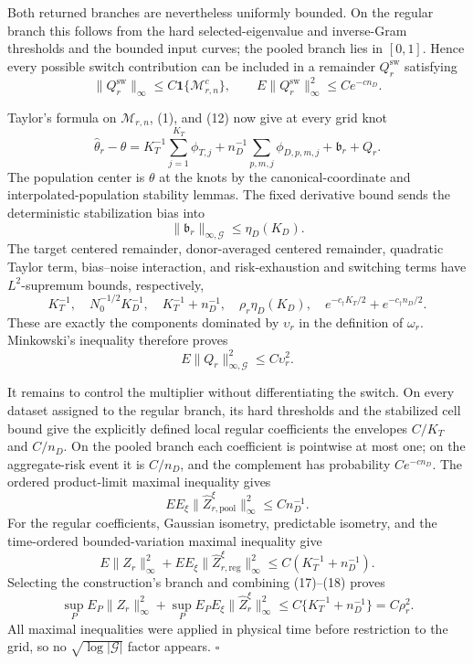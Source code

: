 Both returned branches are nevertheless uniformly bounded.  On the regular branch this follows from the hard selected-eigenvalue and inverse-Gram thresholds and the bounded input curves; the pooled branch lies in \([0,1]\).  Hence every possible switch contribution can be included in a remainder \(Q_r^{\mathrm{sw}}\) satisfying
\[
 \|Q_r^{\mathrm{sw}}\|_\infty
 \le C\mathbf1\{\mathcal M_{r,n}^c\},
 \qquad E\|Q_r^{\mathrm{sw}}\|_\infty^2\le Ce^{-cn_D}. \tag{12}
\]

Taylor's formula on \(\mathcal M_{r,n}\), (1), and (12) now give at every grid knot
\[
 \widehat\theta_r-\theta
 =K_T^{-1}\sum_{j=1}^{K_T}\phi_{T,j}
 +n_D^{-1}\sum_{p,m,j}\phi_{D,p,m,j}
 +\mathfrak b_r+Q_r.                                    \tag{13}
\]
The population center is \(\theta\) at the knots by the canonical-coordinate and interpolated-population stability lemmas.  The fixed derivative bound sends the deterministic stabilization bias into
\[
 \|\mathfrak b_r\|_{\infty,\mathcal G}\le\eta_D(K_D). \tag{14}
\]
The target centered remainder, donor-averaged centered remainder, quadratic Taylor term, bias--noise interaction, and risk-exhaustion and switching terms have \(L^2\)-supremum bounds, respectively,
\[
 K_T^{-1},\quad N_0^{-1/2}K_D^{-1},\quad
 K_T^{-1}+n_D^{-1},\quad \rho_r\eta_D(K_D),\quad
 e^{-c_\dagger K_T/2}+e^{-c_\dagger n_D/2}.             \tag{15}
\]
These are exactly the components dominated by \(\upsilon_r\) in the definition of \(\omega_r\).  Minkowski's inequality therefore proves
\[
 E\|Q_r\|_{\infty,\mathcal G}^2\le C\upsilon_r^2.      \tag{16}
\]

It remains to control the multiplier without differentiating the switch.  On every dataset assigned to the regular branch, its hard thresholds and the stabilized cell bound give the explicitly defined local regular coefficients the envelopes \(C/K_T\) and \(C/n_D\).  On the pooled branch each coefficient is pointwise at most one; on the aggregate-risk event it is \(C/n_D\), and the complement has probability \(Ce^{-cn_D}\).  The ordered product-limit maximal inequality gives
\[
 EE_\xi\|\widehat Z_{r,\mathrm{pool}}^\xi\|_\infty^2
 \le Cn_D^{-1}.                                        \tag{17}
\]
For the regular coefficients, Gaussian isometry, predictable isometry, and the time-ordered bounded-variation maximal inequality give
\[
 E\|Z_r\|_\infty^2+EE_\xi
 \|\widehat Z_{r,\mathrm{reg}}^\xi\|_\infty^2
 \le C(K_T^{-1}+n_D^{-1}).                              \tag{18}
\]
Selecting the construction's branch and combining (17)--(18) proves
\[
 \sup_PE_P\|Z_r\|_\infty^2+
 \sup_PE_PE_\xi\|\widehat Z_r^\xi\|_\infty^2
 \le C\{K_T^{-1}+n_D^{-1}\}=C\rho_r^2.                \tag{19}
\]
All maximal inequalities were applied in physical time before restriction to the grid, so no \(\sqrt{\log|\mathcal G|}\) factor appears. \(\square\)